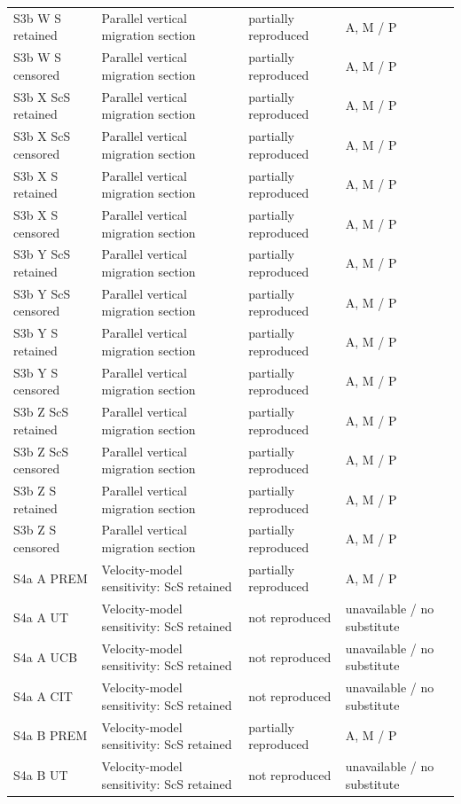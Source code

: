 \documentclass[10pt]{article}
\begin{document}
\begin{longtable}{p{.23\linewidth}p{.25\linewidth}p{.19\linewidth}p{.22\linewidth}}
S3b W S retained & Parallel vertical migration section & partially reproduced & A, M / P \\
S3b W S censored & Parallel vertical migration section & partially reproduced & A, M / P \\
S3b X ScS retained & Parallel vertical migration section & partially reproduced & A, M / P \\
S3b X ScS censored & Parallel vertical migration section & partially reproduced & A, M / P \\
S3b X S retained & Parallel vertical migration section & partially reproduced & A, M / P \\
S3b X S censored & Parallel vertical migration section & partially reproduced & A, M / P \\
S3b Y ScS retained & Parallel vertical migration section & partially reproduced & A, M / P \\
S3b Y ScS censored & Parallel vertical migration section & partially reproduced & A, M / P \\
S3b Y S retained & Parallel vertical migration section & partially reproduced & A, M / P \\
S3b Y S censored & Parallel vertical migration section & partially reproduced & A, M / P \\
S3b Z ScS retained & Parallel vertical migration section & partially reproduced & A, M / P \\
S3b Z ScS censored & Parallel vertical migration section & partially reproduced & A, M / P \\
S3b Z S retained & Parallel vertical migration section & partially reproduced & A, M / P \\
S3b Z S censored & Parallel vertical migration section & partially reproduced & A, M / P \\
S4a A PREM & Velocity-model sensitivity: ScS retained & partially reproduced & A, M / P \\
S4a A UT & Velocity-model sensitivity: ScS retained & not reproduced & unavailable / no substitute \\
S4a A UCB & Velocity-model sensitivity: ScS retained & not reproduced & unavailable / no substitute \\
S4a A CIT & Velocity-model sensitivity: ScS retained & not reproduced & unavailable / no substitute \\
S4a B PREM & Velocity-model sensitivity: ScS retained & partially reproduced & A, M / P \\
S4a B UT & Velocity-model sensitivity: ScS retained & not reproduced & unavailable / no substitute \\

\end{longtable}
\end{document}

